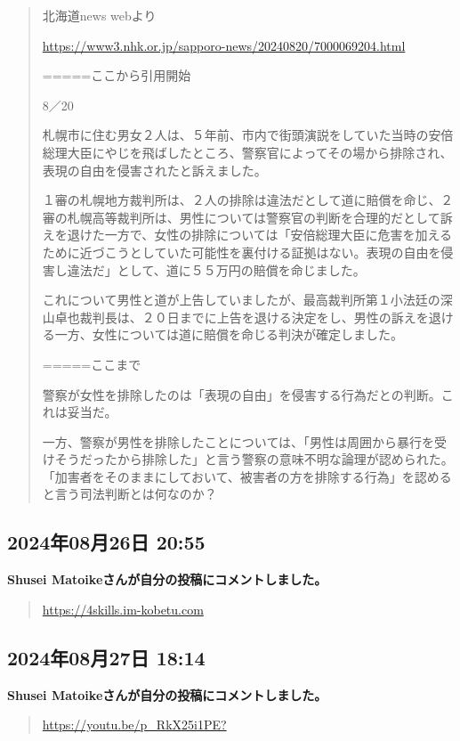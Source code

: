 \begin{quote}
北海道news webより

\url{https://www3.nhk.or.jp/sapporo-news/20240820/7000069204.html}

=====ここから引用開始

8／20

札幌市に住む男女２人は、５年前、市内で街頭演説をしていた当時の安倍総理大臣にやじを飛ばしたところ、警察官によってその場から排除され、表現の自由を侵害されたと訴えました。

１審の札幌地方裁判所は、２人の排除は違法だとして道に賠償を命じ、２審の札幌高等裁判所は、男性については警察官の判断を合理的だとして訴えを退けた一方で、女性の排除については「安倍総理大臣に危害を加えるために近づこうとしていた可能性を裏付ける証拠はない。表現の自由を侵害し違法だ」として、道に５５万円の賠償を命じました。

これについて男性と道が上告していましたが、最高裁判所第１小法廷の深山卓也裁判長は、２０日までに上告を退ける決定をし、男性の訴えを退ける一方、女性については道に賠償を命じる判決が確定しました。

=====ここまで

警察が女性を排除したのは「表現の自由」を侵害する行為だとの判断。これは妥当だ。

一方、警察が男性を排除したことについては、「男性は周囲から暴行を受けそうだったから排除した」と言う警察の意味不明な論理が認められた。「加害者をそのままにしておいて、被害者の方を排除する行為」を認めると言う司法判断とは何なのか？
\end{quote}

\subsection*{2024年08月26日 20:55}

\textbf{Shusei Matoikeさんが自分の投稿にコメントしました。}

\begin{quote}
\url{https://4skills.im-kobetu.com}
\end{quote}

\subsection*{2024年08月27日 18:14}

\textbf{Shusei Matoikeさんが自分の投稿にコメントしました。}

\begin{quote}
\url{https://youtu.be/p_RkX25i1PE?}
\end{quote}

